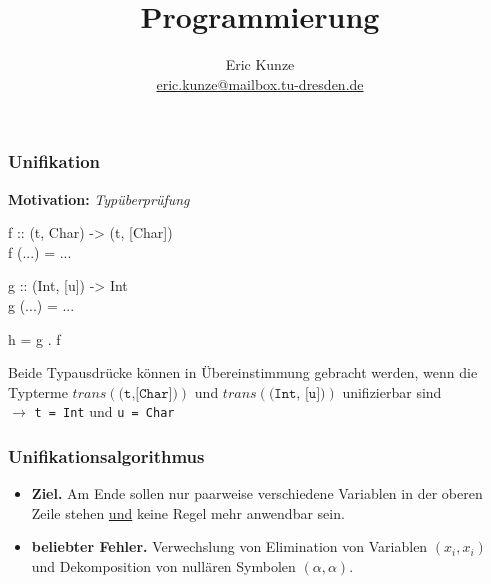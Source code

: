 \documentclass[aspectratio=1610,onlymath, ngerman]{beamer}
\title{Programmierung}%
\subtitle{Übung #1: #2}%
\author{Eric Kunze \\ \url{eric.kunze@mailbox.tu-dresden.de} }%
\date{#3}%
\renewcommand{\emph}[1]{\textbf{#1}}
\begin{document}
    \maketitle
    
    \begin{frame}\frametitle{Unifikation}
%	
	
	\small
	\begin{minipage}{\dimexpr0.5\linewidth-\fboxrule-\fboxsep}
		\emph{Motivation:}
		\textit{Typüberprüfung} \\
		
		\smallskip 
		\begin{ttfamily}
			f :: (t, Char) -> (t, [Char]) \\
			f (...) = ... \\
			
			\smallskip
			
			g :: (Int, [u]) -> Int \\
			g (...) = ... \\
			
			\smallskip
			
			h = g . f
		\end{ttfamily}
	\end{minipage}
	\pause
	\begin{minipage}{\dimexpr0.5\linewidth-\fboxrule-\fboxsep}
		Beide Typausdrücke können in Übereinstimmung gebracht werden, wenn die Typterme $trans(\texttt{(t,[Char])})$ und $trans(\texttt{(Int, [u])})$ unifizierbar sind\\
		
		\smallskip
		\pause
		$\to$ \texttt{t = Int} und \texttt{u = Char}
	\end{minipage}
    \normalsize
    \end{frame}

	\begin{frame}\frametitle{Unifikationsalgorithmus}
	\normalsize
		\begin{itemize}
			\item \emph{Ziel.} Am Ende sollen nur paarweise verschiedene Variablen in der oberen Zeile stehen \underline{und} keine Regel mehr anwendbar sein.
			
			\bigskip
			
			\item \emph{beliebter Fehler.} Verwechslung von Elimination von Variablen $(x_i , x_i)$ und Dekomposition von nullären Symbolen $(\alpha , \alpha)$.
		\end{itemize}
	\end{frame}
\end{document}
